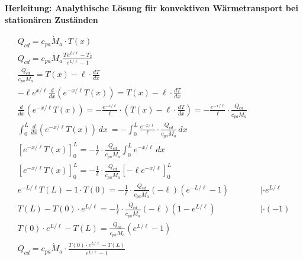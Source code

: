 \documentclass[]{article}
\title{}
\author{}
\begin{document}
\maketitle

\textbf{Herleitung: Analythische Lösung für konvektiven Wärmetransport bei stationären Zuständen}

\begin{equation}
\begin{aligned}
		Q_{cd} = c_{pa} \dot{M}_{a}  \cdot T(x)\\
		Q_{cd} = c_{pa} \dot{M}_{a} \frac{T_{ } e^{L/\ell} - T_{2}}{e^{L/\ell} -1}\\
		\frac{Q_{cd}}{c_{pa} \dot{M}_{a}} = T(x) - \ell \cdot \frac{dT}{dx}\\
		-\ell e^{x/\ell}\frac{d}{dx}\left(e^{-x/\ell} T(x)\right) = T(x) - \ell \cdot \frac{dT}{dx} \\
		\frac{d}{dx}(e^{-x/\ell} T(x)) = - \frac{e^{-x/\ell}}{\ell} \cdot \left(T(x) - \ell \cdot \frac{dT}{dx}\right) = - \frac{e^{-x/\ell}}{\ell} \cdot \frac{Q_{cd}}{c_{pa} \dot{M}_{a}}\\
		\int_{0}^{L} \frac{d}{dx}(e^{-x/\ell} T(x)) \,dx \ = - \int_{0}^{L} \frac{e^{-x/\ell}}{\ell} \cdot \frac{Q_{cd}}{c_{pa} \dot{M}_{a}} \,dx\\
		\left[e^{-x/\ell} T(x)\right]_{0}^{L} = - \frac{1}{\ell} \cdot \frac{Q_{cd}}{c_{pa} \dot{M}_{a}} \int_{0}^{L} e^{-x/\ell} \,dx\\
		\left[e^{-x/\ell} T(x)\right]_{0}^{L} = - \frac{1}{\ell} \cdot \frac{Q_{cd}}{c_{pa} \dot{M}_{a}} \left[-\ell e^{-x/\ell}\right]_{0}^{L}\\
		e^{-L/\ell} T(L) - 1 \cdot T(0) = - \frac{1}{\ell} \cdot \frac{Q_{cd}}{c_{pa} \dot{M}_{a}} (-\ell) \left(e^{-L/\ell} - 1\right) & &| \cdot e^{L/\ell} \\
		T(L) - T(0) \cdot e^{L/\ell} = - \frac{1}{\ell} \cdot \frac{Q_{cd}}{c_{pa} \dot{M}_{a}} (-\ell) \left(1 - e^{L/\ell} \right) & &| \cdot (-1) \\
		T(0) \cdot e^{L/\ell} -T(L) =\frac{Q_{cd}}{c_{pa} \dot{M}_{a}} \left(e^{L/\ell}  - 1 \right)\\
		Q_{cd} = c_{pa} \dot{M}_{a} \cdot \frac{T(0) \cdot e^{L/\ell} -T(L)}{e^{L/\ell}  - 1}\\
\end{aligned}
\end{equation}
\end{document}
